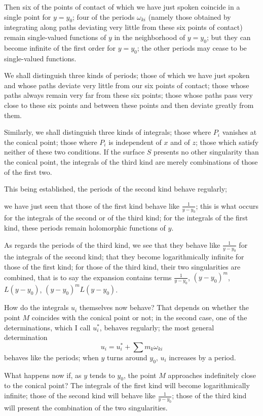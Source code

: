 \documentclass{article}
\begin{document}
Then six of the points of contact of which we have just spoken coincide in a single point for $y = y_{0}$; four of the periods $\omega_{ki}$ (namely those obtained by integrating along paths deviating very little from these six points of contact) remain single-valued functions of $y$ in the neighborhood of $y = y_{0}$; but they can become infinite of the first order for $y = y_{0}$; the other periods may cease to be single-valued functions.

We shall distinguish three kinds of periods; those of which we have just spoken and whose paths deviate very little from our six points of contact; those whose paths always remain very far from these six points; those whose paths pass very close to these six points and between these points and then deviate greatly from them.

Similarly, we shall distinguish three kinds of integrals; those where $P_{i}$ vanishes at the conical point; those where $P_{i}$ is independent of $x$ and of $z$; those which satisfy neither of these two conditions. If the surface $S$ presents no other singularity than the conical point, the integrals of the third kind are merely combinations of those of the first two.

This being established, the periods of the second kind behave regularly;

we have just seen that those of the first kind behave like $\frac{1}{y - y_{0}}$; this is what occurs for the integrals of the second or of the third kind; for the integrals of the first kind, these periods remain holomorphic functions of $y$.

As regards the periods of the third kind, we see that they behave like $\frac{1}{y - y_{0}}$ for the integrals of the second kind; that they become logarithmically infinite for those of the first kind; for those of the third kind, their two singularities are combined, that is to say the expansion contains terms $\frac{1}{y - y_{0}}$, $(y - y_{0})^{m}$, $L(y - y_{0})$, $(y - y_{0})^{m} L(y - y_{0})$.

How do the integrals $u_{i}$ themselves now behave? That depends on whether the point $M$ coincides with the conical point or not; in the second case, one of the determinations, which I call $u_{i}^{*}$, behaves regularly; the most general determination
\[
u_{i} = u_{i}^{*} + \sum m_{k} \omega_{ki}
\]
behaves like the periods; when $y$ turns around $y_{0}$, $u_{i}$ increases by a period.

What happens now if, as $y$ tends to $y_{0}$, the point $M$ approaches indefinitely close to the conical point? The integrals of the first kind will become logarithmically infinite; those of the second kind will behave like $\frac{1}{y - y_{0}}$; those of the third kind will present the combination of the two singularities.
\end{document}
